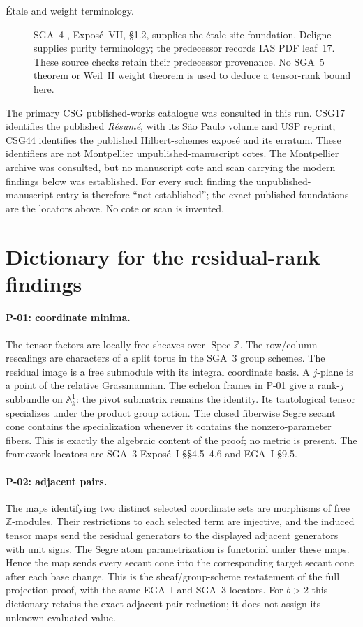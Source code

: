 \begin{description}
\item[\'Etale and weight terminology.]
SGA~4 \cite{SGA4}, Expos\'e~VII, \S1.2, supplies the
\'etale-site foundation. Deligne \cite[Definition~1.2.2,
p.~153]{WeilII} supplies purity terminology; the predecessor
records IAS PDF leaf~17. These source checks retain their
predecessor provenance. No SGA~5 theorem or Weil~II weight
theorem is used to deduce a tensor-rank bound here.
\end{description}

The primary CSG published-works catalogue \cite{CSGWorks}
was consulted in this run. CSG17 identifies the published
\emph{R\'esum\'e}, with its S\~ao Paulo volume and USP reprint;
CSG44 identifies the published Hilbert-schemes expos\'e and
its erratum. These identifiers are not Montpellier
unpublished-manuscript cotes. The Montpellier archive
\cite{MontpellierArchive} was consulted, but no manuscript
cote and scan carrying the modern findings below was
established. For every such finding the unpublished-manuscript
entry is therefore ``not established''; the exact published
foundations are the locators above. No cote or scan is invented.

\section{Dictionary for the residual-rank findings}

\paragraph{P-01: coordinate minima.}
The tensor factors are locally free sheaves over
$\operatorname{Spec}\mathbb Z$. The row/column rescalings
are characters of a split torus in the SGA~3 group schemes.
The residual image is a free submodule with its integral
coordinate basis. A $j$-plane is a point of the relative
Grassmannian. The echelon frames in P-01 give a rank-$j$
subbundle on $\mathbb A^1_k$: the pivot submatrix remains
the identity. Its tautological tensor specializes under
the product group action. The closed fiberwise Segre
secant cone contains the specialization whenever it
contains the nonzero-parameter fibers. This is exactly
the algebraic content of the proof; no metric is present.
The framework locators are SGA~3 Expos\'e~I \S\S4.5--4.6
and EGA~I \S9.5.

\paragraph{P-02: adjacent pairs.}
The maps identifying two distinct selected coordinate
sets are morphisms of free $\mathbb Z$-modules. Their
restrictions to each selected term are injective, and
the induced tensor maps send the residual generators
to the displayed adjacent generators with unit signs.
The Segre atom parametrization is functorial under these
maps. Hence the map sends every secant cone into the
corresponding target secant cone after each base change.
This is the sheaf/group-scheme restatement of the full
projection proof, with the same EGA~I and SGA~3 locators.
For $b>2$ this dictionary retains the exact adjacent-pair
reduction; it does not assign its unknown evaluated value.

